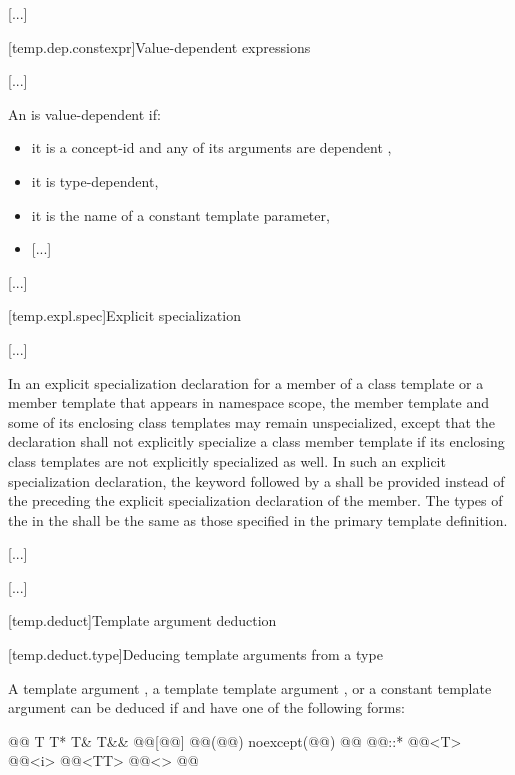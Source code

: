 \documentclass{wg21}
\begin{document}
\textcolor{noteclr}{[...]}

[temp.dep.constexpr]{Value-dependent expressions}

\textcolor{noteclr}{[...]}

\pnum
An
is value-dependent if:
\begin{itemize}
    \item
    it is a concept-id and any of its arguments are dependent ,
    \item
    it is type-dependent,
    \item
    it is the name of a constant template parameter,
    \item
    \textcolor{noteclr}{[...]}
\end{itemize}
\textcolor{noteclr}{[...]}


[temp.expl.spec]{Explicit specialization}

\textcolor{noteclr}{[...]}

\pnum
In an explicit specialization declaration for a member of a class template or
a member template that appears in namespace scope,
the member template and some of its enclosing class templates may remain
unspecialized,
except that the declaration shall not explicitly specialize a class member
template if its enclosing class templates are not explicitly specialized
as well.
In such an explicit specialization declaration, the keyword
followed by a
shall be provided instead of the
preceding the explicit specialization declaration of the member.
The types  of the
in the
shall be the same as those specified in the primary template definition.
\begin{example}
    \textcolor{noteclr}{[...]}
\end{example}

\textcolor{noteclr}{[...]}

[temp.deduct]{Template argument deduction}

[temp.deduct.type]{Deducing template arguments from a type}



\pnum
A  template  argument
,
a template template argument
 ,
or a constant template argument
can be deduced if
and
have one of the following forms:
\begin{codeblock}
    @\opt{\cv{}}@ T
    T*
    T&
    T&&
    @@[@@]
    @@(@@) noexcept(@@)
    @@ @@::*
    @@<T>
    @@<i>
    @@<TT>
    @@<>
    @@
\end{codeblock}
\end{document}
